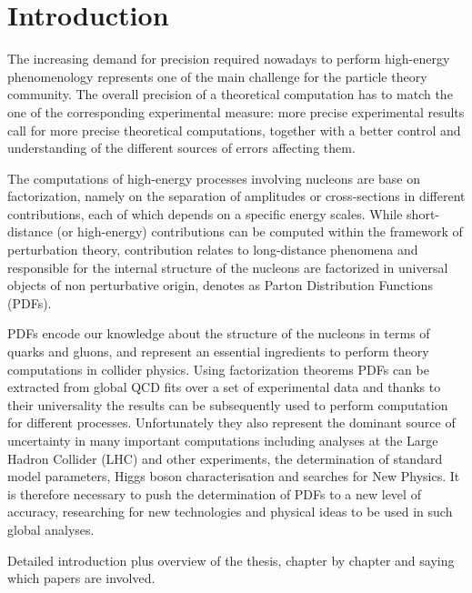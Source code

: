 \chapter*{Introduction}
The increasing demand for precision required nowadays to perform high-energy phenomenology
represents one of the main challenge for the particle theory community. The
overall precision of a theoretical computation has to match the one of the corresponding
experimental measure: more precise  
experimental results call for more precise theoretical computations, together with a better control
and understanding of the different sources of errors affecting them. %

The computations of high-energy processes involving nucleons are base on factorization, namely on the separation
of amplitudes or cross-sections in different contributions, each of which depends on a specific energy scales.
While short-distance (or high-energy) contributions can be computed within the framework of perturbation theory,
contribution relates to long-distance phenomena and responsible for the internal
structure of the nucleons are factorized in universal objects of non perturbative origin,
denotes as Parton Distribution Functions (PDFs).
 

PDFs encode our knowledge about the structure of the nucleons in terms of quarks and
gluons, and represent an essential ingredients to perform theory computations in collider physics.
Using factorization theorems PDFs can be extracted from global QCD fits
over a set of experimental data and thanks to their universality the results can be subsequently used
to perform computation for different processes. 
Unfortunately they also represent the dominant source of uncertainty in many important computations
including analyses at the Large Hadron Collider (LHC) and other experiments,
the determination of standard model parameters, Higgs boson characterisation and searches for New Physics.
It is therefore necessary to push the determination of PDFs to a new level of accuracy,
researching for new technologies and physical ideas to be used in such global analyses.

Detailed introduction plus overview of the thesis, chapter by chapter and saying which papers are involved.